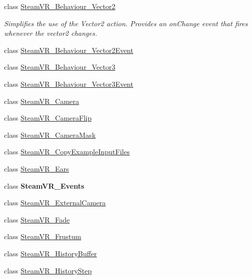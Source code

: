 \begin{DoxyCompactItemize}
\item 
class \mbox{\hyperlink{class_valve_1_1_v_r_1_1_steam_v_r___behaviour___vector2}{Steam\+V\+R\+\_\+\+Behaviour\+\_\+\+Vector2}}
\begin{DoxyCompactList}\small\item\em Simplifies the use of the Vector2 action. Provides an on\+Change event that fires whenever the vector2 changes. \end{DoxyCompactList}\item 
class \mbox{\hyperlink{class_valve_1_1_v_r_1_1_steam_v_r___behaviour___vector2_event}{Steam\+V\+R\+\_\+\+Behaviour\+\_\+\+Vector2\+Event}}
\item 
class \mbox{\hyperlink{class_valve_1_1_v_r_1_1_steam_v_r___behaviour___vector3}{Steam\+V\+R\+\_\+\+Behaviour\+\_\+\+Vector3}}
\item 
class \mbox{\hyperlink{class_valve_1_1_v_r_1_1_steam_v_r___behaviour___vector3_event}{Steam\+V\+R\+\_\+\+Behaviour\+\_\+\+Vector3\+Event}}
\item 
class \mbox{\hyperlink{class_valve_1_1_v_r_1_1_steam_v_r___camera}{Steam\+V\+R\+\_\+\+Camera}}
\item 
class \mbox{\hyperlink{class_valve_1_1_v_r_1_1_steam_v_r___camera_flip}{Steam\+V\+R\+\_\+\+Camera\+Flip}}
\item 
class \mbox{\hyperlink{class_valve_1_1_v_r_1_1_steam_v_r___camera_mask}{Steam\+V\+R\+\_\+\+Camera\+Mask}}
\item 
class \mbox{\hyperlink{class_valve_1_1_v_r_1_1_steam_v_r___copy_example_input_files}{Steam\+V\+R\+\_\+\+Copy\+Example\+Input\+Files}}
\item 
class \mbox{\hyperlink{class_valve_1_1_v_r_1_1_steam_v_r___ears}{Steam\+V\+R\+\_\+\+Ears}}
\item 
class {\bfseries Steam\+V\+R\+\_\+\+Events}
\item 
class \mbox{\hyperlink{class_valve_1_1_v_r_1_1_steam_v_r___external_camera}{Steam\+V\+R\+\_\+\+External\+Camera}}
\item 
class \mbox{\hyperlink{class_valve_1_1_v_r_1_1_steam_v_r___fade}{Steam\+V\+R\+\_\+\+Fade}}
\item 
class \mbox{\hyperlink{class_valve_1_1_v_r_1_1_steam_v_r___frustum}{Steam\+V\+R\+\_\+\+Frustum}}
\item 
class \mbox{\hyperlink{class_valve_1_1_v_r_1_1_steam_v_r___history_buffer}{Steam\+V\+R\+\_\+\+History\+Buffer}}
\item 
class \mbox{\hyperlink{class_valve_1_1_v_r_1_1_steam_v_r___history_step}{Steam\+V\+R\+\_\+\+History\+Step}}

\end{DoxyCompactItemize}

